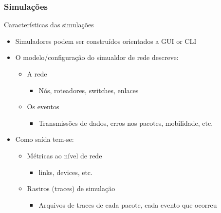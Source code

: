 \documentclass{beamer}
\begin{document}
\begin{frame}\frametitle{Simulações}

\begin{block}{Características das simulações}
	\begin{itemize}
		\item Simuladores podem ser construídos orientados a GUI or CLI
		\item O modelo/configuração do simualdor de rede descreve:
		\begin{itemize}
			\item A rede
			\begin{itemize}
				\item Nós, roteadores, switches, enlaces
			\end{itemize}
			\item Os eventos
			\begin{itemize}
				\item Transmissões de dados, erros nos pacotes, mobilidade, etc.
			\end{itemize}
		\end{itemize}
		
		\item Como saída tem-se:
		\begin{itemize}
			\item Métricas ao nível de rede
			\begin{itemize}
				\item links, devices, etc.
			\end{itemize}
			\item Rastros (traces) de simulação
			\begin{itemize}
				\item Arquivos de traces de cada pacote, cada evento que ocorreu
			\end{itemize}
		\end{itemize}
	\end{itemize}
\end{block}

\end{frame}
\end{document}
